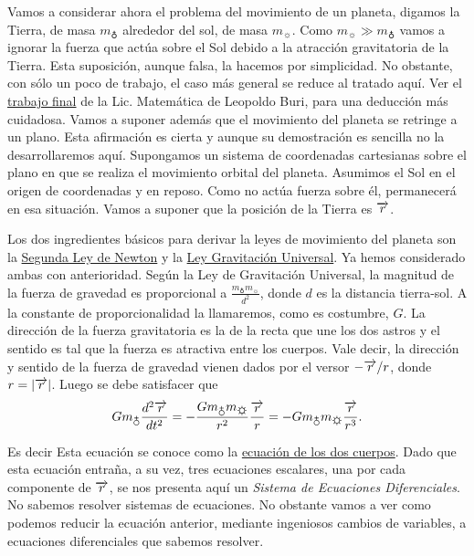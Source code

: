 Vamos a considerar ahora el problema del movimiento de un planeta, digamos la Tierra, de masa $m_{\earth}$ alrededor del sol, de masa $m_{\sun}$. Como
$m_{\sun}\gg m_{\earth}$ vamos a ignorar la fuerza que actúa sobre el Sol debido a la atracción gravitatoria de la Tierra. Esta suposición, aunque falsa, la hacemos
por simplicidad. No obstante, con sólo un poco de trabajo, el caso más general se reduce al tratado aquí. Ver el \href{https://drive.google.com/file/d/0B80iJ0HgObRRbUtUQ2hFQ0FlTG8/view}{trabajo final} de la Lic. Matemática de Leopoldo Buri,
para una deducción más cuidadosa. Vamos a suponer además que el movimiento del planeta se retringe a un plano. Esta afirmación es cierta y aunque su demostración
es sencilla no la desarrollaremos aquí.
Supongamos un sistema de coordenadas cartesianas sobre el plano en que se realiza el movimiento orbital del planeta. Asumimos el Sol en el origen de coordenadas y en
reposo. Como no actúa fuerza sobre él, permanecerá en esa situación. Vamos a suponer que la posición de la Tierra es $\overrightarrow{r}$.

Los dos ingredientes básicos para derivar la leyes de movimiento del planeta son la
\href{http://es.wikipedia.org/wiki/Leyes_de_Newton\#Segunda_ley_de_Newton_o_ley_de_fuerza}{Segunda Ley de Newton} y la
\href{http://es.wikipedia.org/wiki/Ley_de_gravitación_universal}{Ley Gravitación Universal}. Ya hemos considerado ambas con anterioridad.
Según la Ley de Gravitación Universal, la magnitud de la fuerza de gravedad es proporcional a $\frac{m_{\earth}m_{\sun}}{d^2}$, donde $d$ es la distancia tierra-sol.
A la constante de proporcionalidad la llamaremos, como es costumbre, $G$. La dirección de la fuerza gravitatoria es la de la recta que une los dos astros y
el sentido es tal que la fuerza es atractiva entre los cuerpos. Vale decir, la dirección y sentido de la
fuerza de gravedad vienen dados por el versor $-\overrightarrow{r}/r$, donde $r=|\overrightarrow{r}|$. Luego se debe satisfacer que
\[Gm_{\earth}\frac{d^2\v{r}}{dt^2}=-\frac{Gm_{\earth}m_{\sun}}{r^2}\frac{\v{r}}{r}=-Gm_{\earth}m_{\sun}\frac{\v{r}}{r^3}. \]


Es decir
Esta ecuación se conoce como la \href{http://es.wikipedia.org/wiki/Problema_de_los_dos_cuerpos}{ecuación de los dos cuerpos}.
Dado que esta ecuación entraña, a su vez, tres ecuaciones escalares, una por cada
componente de $\overrightarrow{r}$, se nos presenta aquí un \emph{Sistema de Ecuaciones Diferenciales}. No sabemos resolver sistemas de ecuaciones. No obstante vamos
a ver como podemos reducir la ecuación anterior, mediante ingeniosos cambios de
variables, a ecuaciones diferenciales que sabemos resolver.


